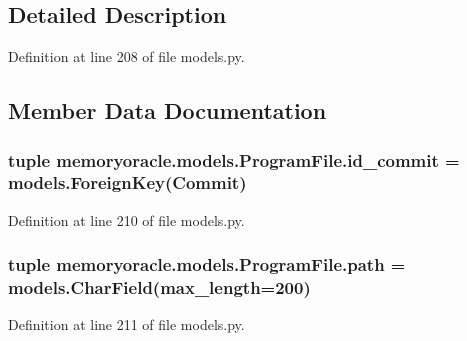 \subsection{Detailed Description}


Definition at line 208 of file models.\+py.



\subsection{Member Data Documentation}
\hypertarget{classmemoryoracle_1_1models_1_1ProgramFile_a043ca59562f8a3e9895a1b1fa54fb112}{}
\subsubsection[{id\+\_\+commit}]{\setlength{\rightskip}{0pt plus 5cm}tuple memoryoracle.\+models.\+Program\+File.\+id\+\_\+commit = models.\+Foreign\+Key({\bf Commit})\hspace{0.3cm}{\ttfamily [static]}}\label{classmemoryoracle_1_1models_1_1ProgramFile_a043ca59562f8a3e9895a1b1fa54fb112}


Definition at line 210 of file models.\+py.

\hypertarget{classmemoryoracle_1_1models_1_1ProgramFile_a7a0ec571a959e879f3dde8d10907e6cb}{}
\subsubsection[{path}]{\setlength{\rightskip}{0pt plus 5cm}tuple memoryoracle.\+models.\+Program\+File.\+path = models.\+Char\+Field(max\+\_\+length=200)\hspace{0.3cm}{\ttfamily [static]}}\label{classmemoryoracle_1_1models_1_1ProgramFile_a7a0ec571a959e879f3dde8d10907e6cb}


Definition at line 211 of file models.\+py.

\hypertarget{classmemoryoracle_1_1models_1_1ProgramFile_a81df4da5004a89d6d07ad8d104a67e56}{}
